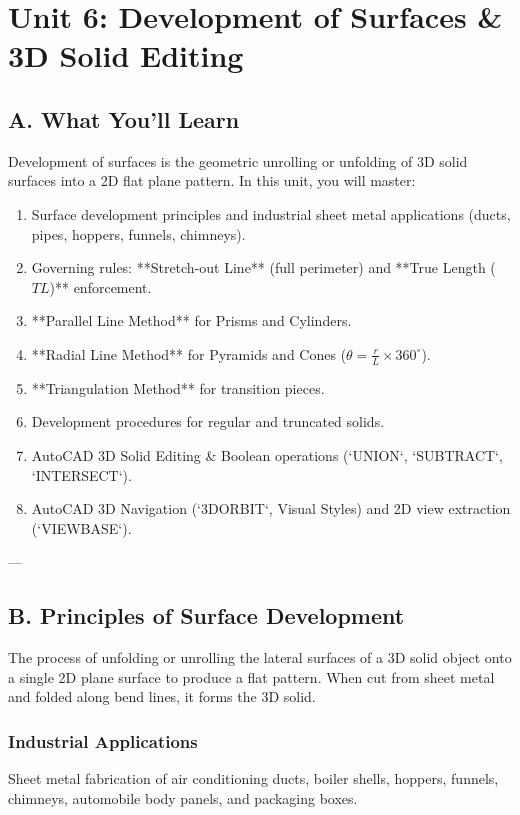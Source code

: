 \chapter{Unit 6: Development of Surfaces \& 3D Solid Editing}

\section{A. What You'll Learn}
Development of surfaces is the geometric unrolling or unfolding of 3D solid surfaces into a 2D flat plane pattern. In this unit, you will master:
\begin{enumerate}
    \item Surface development principles and industrial sheet metal applications (ducts, pipes, hoppers, funnels, chimneys).
    \item Governing rules: **Stretch-out Line** (full perimeter) and **True Length ($TL$)** enforcement.
    \item **Parallel Line Method** for Prisms and Cylinders.
    \item **Radial Line Method** for Pyramids and Cones ($\theta = \frac{r}{L} \times 360^\circ$).
    \item **Triangulation Method** for transition pieces.
    \item Development procedures for regular and truncated solids.
    \item AutoCAD 3D Solid Editing \& Boolean operations (`UNION`, `SUBTRACT`, `INTERSECT`).
    \item AutoCAD 3D Navigation (`3DORBIT`, Visual Styles) and 2D view extraction (`VIEWBASE`).
\end{enumerate}

---

\section{B. Principles of Surface Development}

\begin{definition}
The process of unfolding or unrolling the lateral surfaces of a 3D solid object onto a single 2D plane surface to produce a flat pattern. When cut from sheet metal and folded along bend lines, it forms the 3D solid.
\end{definition}

\subsection{Industrial Applications}
Sheet metal fabrication of air conditioning ducts, boiler shells, hoppers, funnels, chimneys, automobile body panels, and packaging boxes.

